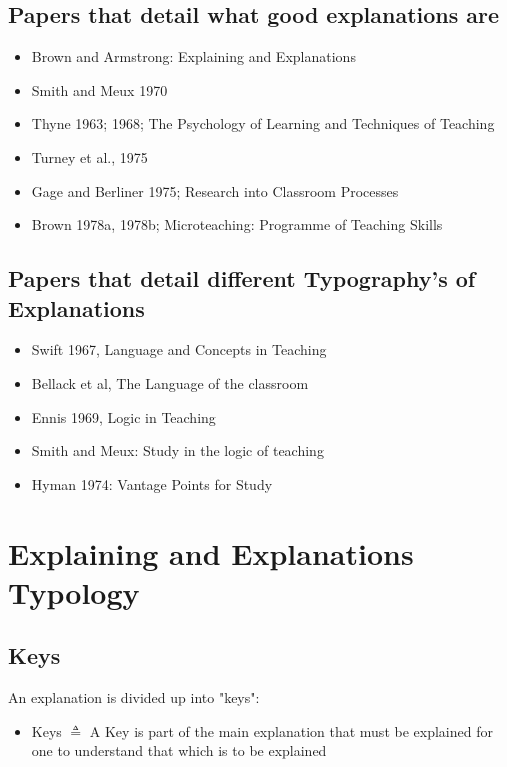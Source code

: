 \documentclass[10pt, letterpaper]{article}
\begin{document}
\subsection*{Papers that detail what good explanations are}
\label{sec:org7e2f1e6}
\begin{itemize}
\item Brown and Armstrong: Explaining and Explanations \cite{brown1984explaining}
\item Smith and Meux 1970
\item Thyne 1963; 1968; The Psychology of Learning and Techniques of Teaching \cite{thyne1965psychology}
\item Turney et al., 1975
\item Gage and Berliner 1975; Research into Classroom Processes
\item Brown 1978a, 1978b; Microteaching: Programme of Teaching Skills \cite{10.2307/3120386}
\end{itemize}

\subsection*{Papers that detail different Typography's of Explanations}
\label{sec:org546c812}
\begin{itemize}
\item Swift 1967, Language and Concepts in Teaching \cite{smith1967language}
\item Bellack et al, The Language of the classroom \cite{bellack1966language}
\item Ennis 1969, Logic in Teaching \cite{ennis1969logic}
\item Smith and Meux: Study in the logic of teaching \cite{Smith1970-SMIASO-13}
\item Hyman 1974: Vantage Points for Study \cite{hyman1968teaching}
\end{itemize}


\section*{Explaining and Explanations Typology}
\label{sec:orgb505335}

\subsection*{Keys}
\label{sec:org100db2f}
An explanation is divided up into "keys":
\begin{itemize}
\item Keys \(\triangleq\) A Key is part of the main explanation that must be explained for one to understand that which is to be explained
\end{itemize}
\end{document}
